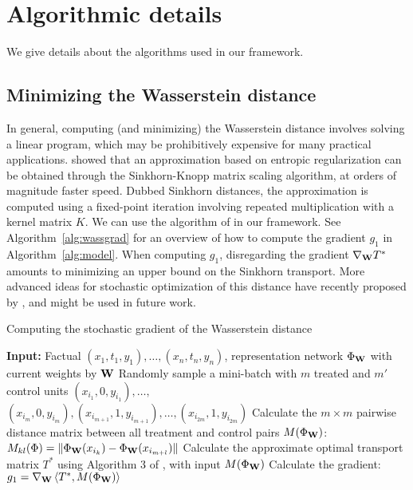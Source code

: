 \documentclass{article}
\begin{document}
 \section{Algorithmic details}\label{sec:appmodel}

We give details about the algorithms used in our framework. 



\subsection{Minimizing the Wasserstein distance}
In general, computing (and minimizing) the Wasserstein distance involves solving a linear program, which may be prohibitively expensive for many practical applications. \citet{cuturi2013sinkhorn} showed that an approximation based on entropic regularization can be obtained through the Sinkhorn-Knopp matrix scaling algorithm, at orders of magnitude faster speed. Dubbed Sinkhorn distances, the approximation is computed using a fixed-point iteration involving repeated multiplication with a kernel matrix $K$. We can use the algorithm of \citet{cuturi2013sinkhorn} in our framework. See Algorithm~\ref{alg:wassgrad} for an overview of how to compute the gradient $g_1$ in Algorithm~\ref{alg:model}. When computing $g_1$, disregarding the gradient $\nabla_{\bf W} T^*$ amounts to minimizing an upper bound on the Sinkhorn transport. More advanced ideas for stochastic optimization of this distance have recently proposed by \citet{aude2016stochastic}, and might be used in future work.

\begin{algorithm}[tbp]
\caption{Computing the stochastic gradient of the Wasserstein distance}
\label{alg:wassgrad}
\begin{algorithmic}[1]
  \STATE \textbf{Input:} Factual  $(x_1,t_1,y_1), \ldots , (x_n,t_n,y_n)$, representation network $\Phi_{\bf{W}}$ with current weights by $\bf{W}$
  \STATE Randomly sample a mini-batch with $m$ treated and $m'$ control units $(x_{i_1},0,y_{i_1}), \ldots , $\\
  $(x_{i_m},0,y_{i_m}),  (x_{i_{m+1}},1,y_{i_{m+1}}), \ldots , (x_{i_{2m}},1,y_{i_{2m}}) $
   \STATE Calculate the $m \times m$ pairwise distance matrix between all treatment and control pairs $M(\Phi_{\bf{W}})$: \\
   $M_{kl}(\Phi) = \|\Phi_{\bf{W}}(x_{i_k}) - \Phi_{\bf{W}}(x_{i_{m+l}})\|$
    \STATE Calculate the approximate optimal transport matrix $T^*$ using Algorithm 3 of \citet{cuturi2014fast}, with input $M(\Phi_{\bf{W}})$
  \STATE Calculate the gradient:\\ $g_1 = \nabla_{\bf{W}} \left< T^*,M(\Phi_{\bf{W}})\right>$
  \vspace{0.2em}
\end{algorithmic}
\end{algorithm}
\end{document}
